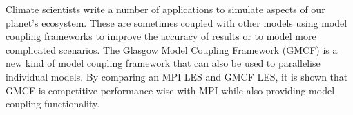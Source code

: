 Climate scientists write a number of applications to simulate aspects of our
planet's ecosystem. These are sometimes coupled with other models using model
coupling frameworks to improve the accuracy of results or to model more
complicated scenarios. The Glasgow Model Coupling Framework (GMCF) is a new kind
of model coupling framework that can also be used to parallelise individual
models. By comparing an MPI LES and GMCF LES, it is shown that GMCF is
competitive performance-wise with MPI while also providing model coupling
functionality.
